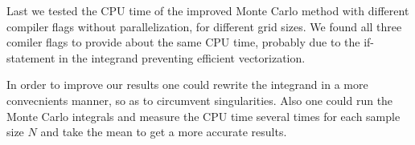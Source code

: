 \documentclass[10pt, twocolumn]{aastex62}
\begin{document}
Last we tested the CPU time of the improved Monte Carlo method with different
compiler flags without parallelization, for different grid sizes. We found
all three comiler flags to provide about the same CPU time, probably due to the
if-statement in the integrand preventing efficient vectorization.

In order to improve our results one could rewrite the integrand in a more
convecnients manner, so as to circumvent singularities. Also one could run the
Monte Carlo integrals and measure the CPU time several times for each sample size
$N$ and take the mean to get a more accurate results.

\nocite{jensen:2019}

  
\end{document}
